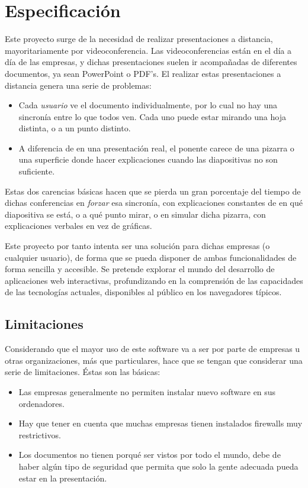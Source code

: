 \section{Especificaci\'on} %
\label{sec:especificacion}

Este proyecto surge de la necesidad de realizar presentaciones a distancia, mayoritariamente por videoconferencia. Las videoconferencias están en el día a día de las empresas, y dichas presentaciones suelen ir acompañadas de diferentes documentos, ya sean PowerPoint o PDF's. El realizar estas presentaciones a distancia genera una serie de problemas:

\begin{itemize}
	\item Cada \emph{usuario} ve el documento individualmente, por lo cual no hay una sincronía entre lo que todos ven. Cada uno puede estar mirando una hoja distinta, o a un punto distinto.
	\item A diferencia de en una presentación real, el ponente carece de una pizarra o una superficie donde hacer explicaciones cuando las diapositivas no son suficiente.
\end{itemize}

Estas dos carencias básicas hacen que se pierda un gran porcentaje del tiempo de dichas conferencias en \emph{forzar} esa sincronía, con explicaciones constantes de en qué diapositiva se está, o a qué punto mirar, o en simular dicha pizarra, con explicaciones verbales en vez de gráficas.

Este proyecto por tanto intenta ser una solución para dichas empresas (o cualquier usuario), de forma que se pueda disponer de ambas funcionalidades de forma sencilla y accesible. Se pretende explorar el mundo del desarrollo de aplicaciones web interactivas, profundizando en la comprensión de las capacidades de las tecnologías actuales, disponibles al público en los navegadores típicos.

\subsection{Limitaciones}
Considerando que el mayor uso de este software va a ser por parte de empresas u otras organizaciones, más que particulares, hace que se tengan que considerar una serie de limitaciones. Éstas son las básicas:

\begin{itemize}
	\item Las empresas generalmente no permiten instalar nuevo software en sus ordenadores.
	\item Hay que tener en cuenta que muchas empresas tienen instalados firewalls muy restrictivos.
	\item Los documentos no tienen porqué ser vistos por todo el mundo, debe de haber algún tipo de seguridad que permita que solo la gente adecuada pueda estar en la presentación.
\end{itemize}


